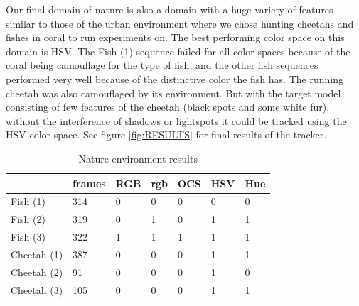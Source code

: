 \documentclass[a4paper,11pt]{article}
\begin{document}
		Our final domain of nature is also a domain with a huge variety of features similar to those of the urban environment where we chose hunting cheetahs and fishes in coral to run experiments on. The best performing color space on this domain is HSV. The Fish (1) sequence failed for all color-spaces because of the coral being camouflage for the type of fish, and the other fish sequences performed very well because of the distinctive color the fish has. The running cheetah was also camouflaged by its environment. But with the target model consisting of few features of the cheetah (black spots and some white fur), without the interference of shadows or lightspots it could be tracked using the HSV color space. See figure \ref{fig:RESULTS} for final results of the tracker. 
		
		\begin{table}[H]
			\centering
			\begin{tabular}{ | l | l | l | l | l | l | l |}
			\hline
			           & frames & RGB & rgb & OCS & HSV & Hue \\
			\hline
			Fish    (1)& 314   & 0   & 0   & 0   & 0   & 0 \\
			Fish    (2)& 319   & 0   & 1   & 0   & 1   & 1 \\
			Fish    (3)& 322   & 1   & 1   & 1   & 1   & 1 \\
			Cheetah (1)& 387   & 0   & 0   & 0   & 1   & 1 \\
			Cheetah (2)&  91   & 0   & 0   & 0   & 1   & 0 \\
			Cheetah (3)& 105   & 0   & 0   & 0   & 1   & 1 \\
			\hline
			\end{tabular}
			\caption{Nature environment results}
			\label{table:an}
		\end{table}
		\noindent
		
\end{document}
